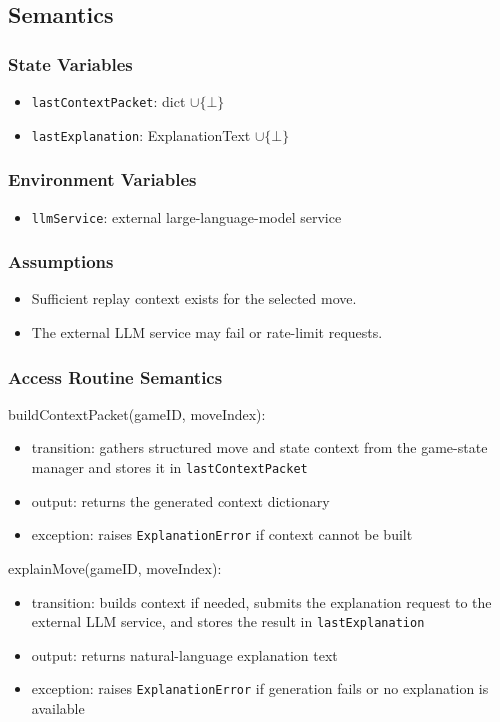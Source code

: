 \documentclass[12pt, titlepage]{article}
\begin{document}
\subsection{Semantics}

\subsubsection{State Variables}
\begin{itemize}
\item \texttt{lastContextPacket}: dict $\cup \{\bot\}$
\item \texttt{lastExplanation}: ExplanationText $\cup \{\bot\}$
\end{itemize}

\subsubsection{Environment Variables}
\begin{itemize}
\item \texttt{llmService}: external large-language-model service
\end{itemize}

\subsubsection{Assumptions}
\begin{itemize}
    \item Sufficient replay context exists for the selected move.
    \item The external LLM service may fail or rate-limit requests.
\end{itemize}

\subsubsection{Access Routine Semantics}

\noindent buildContextPacket(gameID, moveIndex):
\begin{itemize}
\item transition: gathers structured move and state context from the game-state manager and stores it in \texttt{lastContextPacket}
\item output: returns the generated context dictionary
\item exception: raises \texttt{ExplanationError} if context cannot be built
\end{itemize}

\noindent explainMove(gameID, moveIndex):
\begin{itemize}
\item transition: builds context if needed, submits the explanation request to the external LLM service, and stores the result in \texttt{lastExplanation}
\item output: returns natural-language explanation text
\item exception: raises \texttt{ExplanationError} if generation fails or no explanation is available
\end{itemize}
\end{document}
